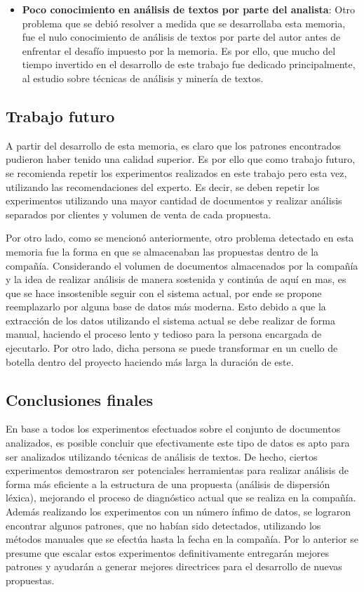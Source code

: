 \begin{itemize}
        \item \textbf{Poco conocimiento en análisis de textos por parte del analista}: Otro problema que se debió resolver a medida que se desarrollaba esta memoria, fue el nulo conocimiento de análisis de textos por parte del autor antes de enfrentar el desafío impuesto por la memoria. Es por ello, que mucho del tiempo invertido en el desarrollo de este trabajo fue dedicado principalmente, al estudio sobre técnicas de análisis y minería de textos. 
        
    \end{itemize}

\subsection{Trabajo futuro}
    A partir del desarrollo de esta memoria, es claro que los patrones encontrados pudieron haber tenido una calidad superior. Es por ello que como trabajo futuro, se recomienda repetir los experimentos realizados en este trabajo pero esta vez, utilizando las recomendaciones del experto. Es decir, se deben repetir los experimentos utilizando una mayor cantidad de documentos y realizar análisis separados por clientes y volumen de venta de cada propuesta. 
    
    Por otro lado, como se mencionó anteriormente, otro problema detectado en esta memoria fue la forma en que se almacenaban las propuestas dentro de la compañía. Considerando el volumen de documentos almacenados por la compañía y la idea de realizar análisis de manera sostenida y continúa de aquí en mas, es que se hace insostenible seguir con el sistema actual, por ende se propone reemplazarlo por alguna base de datos más moderna. Esto debido a que la extracción de los datos utilizando el sistema actual se debe realizar de forma manual, haciendo el proceso lento y tedioso para la persona encargada de ejecutarlo. Por otro lado, dicha persona se puede transformar en un cuello de botella dentro del proyecto haciendo más larga la duración de este. 

\subsection{Conclusiones finales}
    En base a todos los experimentos efectuados sobre el conjunto de documentos analizados, es posible concluir que efectivamente este tipo de datos es apto para ser analizados utilizando técnicas de análisis de textos. De hecho, ciertos experimentos demostraron ser potenciales herramientas para realizar análisis de forma más eficiente a la estructura de una propuesta (análisis de dispersión léxica), mejorando el proceso de diagnóstico actual que se realiza en la compañía. Además realizando los experimentos con un número ínfimo de datos, se lograron encontrar algunos patrones, que no habían sido detectados, utilizando los métodos manuales que se efectúa hasta la fecha en la compañía. Por lo anterior se presume que escalar estos experimentos definitivamente entregarán mejores patrones y ayudarán a generar mejores directrices para el desarrollo de nuevas propuestas.



